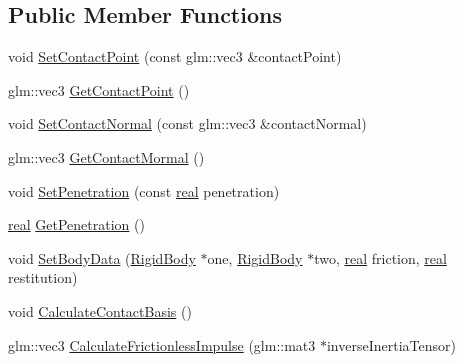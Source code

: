 \subsection*{Public Member Functions}
\begin{DoxyCompactItemize}
\item 
void \hyperlink{classrum_1_1_contact_a64ba0fca39f090fd7f211cb1a7585578}{Set\+Contact\+Point} (const glm\+::vec3 \&contact\+Point)
\item 
glm\+::vec3 \hyperlink{classrum_1_1_contact_a1a21b5351b7b4a84e05557232cc8b838}{Get\+Contact\+Point} ()
\item 
void \hyperlink{classrum_1_1_contact_a0e0cd538aab86185bd22e6660e225db2}{Set\+Contact\+Normal} (const glm\+::vec3 \&contact\+Normal)
\item 
glm\+::vec3 \hyperlink{classrum_1_1_contact_a4f3310ec7a77f61dbf8733b0fe127550}{Get\+Contact\+Mormal} ()
\item 
void \hyperlink{classrum_1_1_contact_a713b7b8eb8adcf50a616ab9e1b391ecc}{Set\+Penetration} (const \hyperlink{namespacerum_a7e8cca23573d5eaead0f138cbaa4862c}{real} penetration)
\item 
\hyperlink{namespacerum_a7e8cca23573d5eaead0f138cbaa4862c}{real} \hyperlink{classrum_1_1_contact_a337aa264d344357959c3f31494610292}{Get\+Penetration} ()
\item 
void \hyperlink{classrum_1_1_contact_ada3b091bf846f790e889c9cc526f47df}{Set\+Body\+Data} (\hyperlink{classrum_1_1_rigid_body}{Rigid\+Body} $\ast$one, \hyperlink{classrum_1_1_rigid_body}{Rigid\+Body} $\ast$two, \hyperlink{namespacerum_a7e8cca23573d5eaead0f138cbaa4862c}{real} friction, \hyperlink{namespacerum_a7e8cca23573d5eaead0f138cbaa4862c}{real} restitution)
\item 
void \hyperlink{classrum_1_1_contact_af2b19ba7393d8596ec34aac2de9aebfa}{Calculate\+Contact\+Basis} ()
\item 
glm\+::vec3 \hyperlink{classrum_1_1_contact_a74dad6b365bbe5337e61c2cfeed9f247}{Calculate\+Frictionless\+Impulse} (glm\+::mat3 $\ast$inverse\+Inertia\+Tensor)
\end{DoxyCompactItemize}
